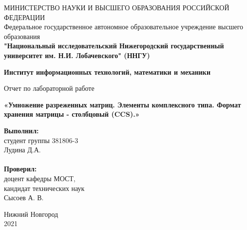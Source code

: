 \documentclass{report}
\begin{document}
\begin{titlepage}

\begin{center}
МИНИСТЕРСТВО НАУКИ И ВЫСШЕГО ОБРАЗОВАНИЯ РОССИЙСКОЙ ФЕДЕРАЦИИ\\
Федеральное государственное автономное образовательное учреждение высшего образования \\
\textbf{"Национальный исследовательский Нижегородский государственный университет им. Н.И. Лобачевского" (ННГУ)}
\end{center}

\begin{center}
\textbf{Институт информационных технологий, математики и механики}
\end{center}

\vspace{4em}

\begin{center}
Отчет по лабораторной работе \\
\end{center}
\begin{center}
\textbf{\Large«Умножение разреженных матриц. Элементы комплексного типа. Формат хранения матрицы - столбцовый (CCS).»} \\
\end{center}

\vspace{4em}

\newbox{\lbox}
\newlength{\maxl}
\setlength{\maxl}{\wd\lbox}
\hfill\parbox{7cm}{
\hspace*{5cm}\hspace*{-5cm}\textbf{Выполнил:} \\ студент группы 381806-3 \\ Лудина Д.А.\\
\\
\hspace*{5cm}\hspace*{-5cm}\textbf{Проверил:}\\ доцент кафедры МОСТ, \\ кандидат технических наук \\ Сысоев А. В.\\
}
\vspace{\fill}

\begin{center} Нижний Новгород \\ 2021 \end{center}

\end{titlepage}
\end{document}
